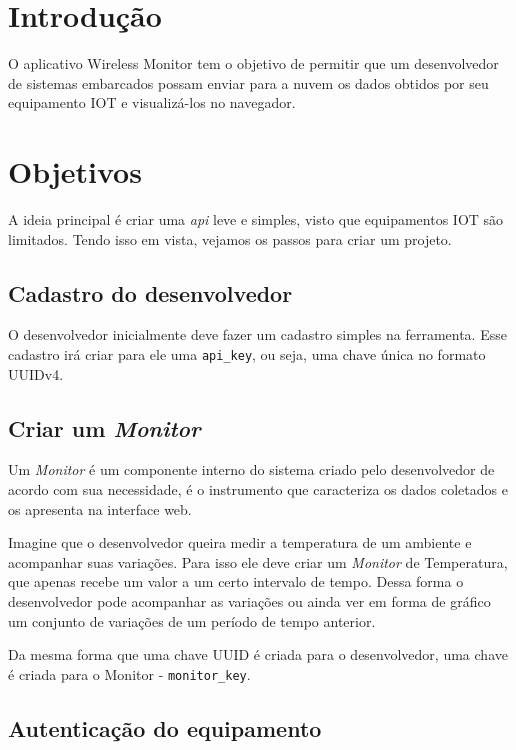 \section{Introdução}\label{introduuxe7uxe3o}

O aplicativo Wireless Monitor tem o objetivo de permitir que um
desenvolvedor de sistemas embarcados possam enviar para a nuvem os dados
obtidos por seu equipamento IOT e visualizá-los no navegador.

\section{Objetivos}\label{objetivos}

A ideia principal é criar uma \emph{api} leve e simples, visto que
equipamentos IOT são limitados. Tendo isso em vista, vejamos os passos
para criar um projeto.

\subsection{Cadastro do desenvolvedor}\label{cadastro-do-desenvolvedor}

O desenvolvedor inicialmente deve fazer um cadastro simples na
ferramenta. Esse cadastro irá criar para ele uma \texttt{api\_key}, ou
seja, uma chave única no formato UUIDv4.

\subsection{Criar um \emph{Monitor}}\label{criar-um-monitor}

Um \emph{Monitor} é um componente interno do sistema criado pelo
desenvolvedor de acordo com sua necessidade, é o instrumento que
caracteriza os dados coletados e os apresenta na interface web.

Imagine que o desenvolvedor queira medir a temperatura de um ambiente e
acompanhar suas variações. Para isso ele deve criar um \emph{Monitor} de
Temperatura, que apenas recebe um valor a um certo intervalo de tempo.
Dessa forma o desenvolvedor pode acompanhar as variações ou ainda ver em
forma de gráfico um conjunto de variações de um período de tempo
anterior.

Da mesma forma que uma chave UUID é criada para o desenvolvedor, uma
chave é criada para o Monitor - \texttt{monitor\_key}.

\subsection{Autenticação do
equipamento}\label{autenticauxe7uxe3o-do-equipamento}

